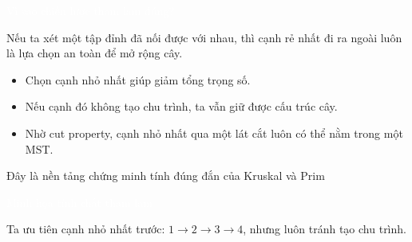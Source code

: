\documentclass{beamer}
\newcommand{\hlblue}[1]{\textcolor{myblue}{#1}}
\newcommand{\hlgreen}[1]{\textcolor{mygreen}{#1}}
\newcommand{\hlpurple}[1]{\textcolor{mypurple}{#1}}
\newcommand{\hlorange}[1]{\textcolor{myorange}{#1}}
\newcommand{\hlwhite}[1]{\textcolor{white}{#1}}
\begin{document}
\begin{frame}{\hlwhite{Vì sao chiến lược tham lam đúng?}}
\begin{tcolorbox}[title=\textbf{\hlgreen{Lý do chính}}]
Nếu ta xét một tập đỉnh đã nối được với nhau, thì cạnh rẻ nhất đi ra ngoài luôn là lựa chọn an toàn để mở rộng cây.
\end{tcolorbox}

\begin{itemize}
  \item Chọn cạnh nhỏ nhất giúp giảm tổng trọng số.
  \item Nếu cạnh đó không tạo chu trình, ta vẫn giữ được cấu trúc cây.
  \item Nhờ \hlblue{cut property}, cạnh nhỏ nhất qua một lát cắt luôn có thể nằm trong một MST.
\end{itemize}

\begin{tcolorbox}
\centering
\hlorange{Đây là nền tảng chứng minh tính đúng đắn của Kruskal và Prim}
\end{tcolorbox}
\end{frame}


\begin{frame}{\hlwhite{Minh họa tính chất tham lam}}
\centering
{}

\vspace{0.25cm}
\hlpurple{Ta ưu tiên cạnh nhỏ nhất trước: \(1 \rightarrow 2 \rightarrow 3 \rightarrow 4\), nhưng luôn tránh tạo chu trình.}
\end{frame}
\end{document}
